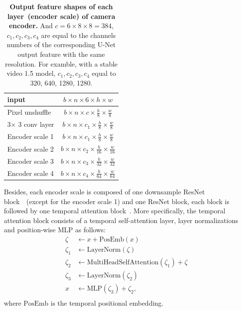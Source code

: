 \begin{table}[t]
    \centering\small
    \caption{\textbf{Output feature shapes of each layer~(encoder scale) of camera encoder.} And $c = 6\times8\times8=384$, $c_1, c_2, c_3, c_4$ are equal to the channels numbers of the corresponding U-Net output feature with the same resolution. For examble, with a stable video 1.5 model, $c_1, c_2, c_3, c_4$ equal to 320, 640, 1280, 1280.}
    \setlength{\tabcolsep}{8pt}
    \begin{tabular}{lc}
        \toprule
        \textbf{input} & $b\times n \times 6 \times h \times w$ \\
        \midrule
        Pixel unshuffle & $b\times n \times c \times \frac{h}{8} \times \frac{w}{8}$ \\
        3$\times$ 3 conv layer & $b\times n \times c_1 \times \frac{h}{8} \times \frac{w}{8}$ \\
        Encoder scale 1 & $b\times n \times c_1 \times \frac{h}{8} \times \frac{w}{8}$ \\
        Encoder scale 2 & $b\times n \times c_2 \times \frac{h}{16} \times \frac{w}{16}$ \\
        Encoder scale 3 & $b\times n \times c_3 \times \frac{h}{32} \times \frac{w}{32}$ \\
        Encoder scale 4 & $b\times n \times c_4 \times \frac{h}{64} \times \frac{w}{64}$ \\
        \bottomrule
    \end{tabular}
    \label{supptable:output_shape}
\end{table}

Besides, each encoder scale is composed of one downsample ResNet block~\citep{t2iadaptor}~(except for the encoder scale 1) and one ResNet block, each block is followed by one temporal attention block~\citep{animatediff}.
%
More specifically, the temporal attention block consists of a temporal self-attention layer, layer normalizations and position-wise MLP as follows:
\begin{align}
    \zeta &\leftarrow x + \mathrm{PosEmb}(x) \\
    \zeta_1 &\leftarrow \mathrm{LayerNorm}(\zeta) \\
    \zeta_2 &\leftarrow \mathrm{MultiHeadSelfAttention}(\zeta_1) + \zeta \\
    \zeta_3 &\leftarrow \mathrm{LayerNorm}(\zeta_2) \\
    x &\leftarrow \mathrm{MLP}(\zeta_3) + \zeta_2,\\
\end{align}
where $\mathrm{PosEmb}$ is the temporal positional embedding.

